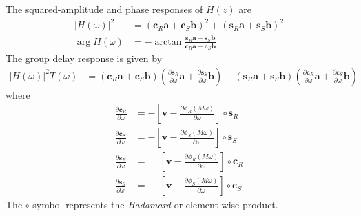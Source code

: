 \documentclass[a4paper,twoside,10pt,english]{report}
\begin{document}
The squared-amplitude and phase responses of $H\left(z\right)$ are
\begin{align*}
\left|H\left(\omega\right)\right|^{2}&=
\left(\boldsymbol{c}_{R}\boldsymbol{a}+
\boldsymbol{c}_{S}\boldsymbol{b}\right)^{2}+
\left(\boldsymbol{s}_{R}\boldsymbol{a}+
\boldsymbol{s}_{S}\boldsymbol{b}\right)^{2}\\
\arg H\left(\omega\right)&=-\arctan 
\frac{\boldsymbol{s}_{R}\boldsymbol{a}+\boldsymbol{s}_{S}\boldsymbol{b}}
     {\boldsymbol{c}_{R}\boldsymbol{a}+\boldsymbol{c}_{S}\boldsymbol{b}}
\end{align*}
The group delay response is given by
\begin{align*}
\left|H\left(\omega\right)\right|^{2}T\left(\omega\right)&=
\left(\boldsymbol{c}_{R}\boldsymbol{a}+
      \boldsymbol{c}_{S}\boldsymbol{b}\right)
\left(\frac{\partial\boldsymbol{s}_{R}}{\partial\omega}\boldsymbol{a}+
      \frac{\partial\boldsymbol{s}_{S}}{\partial\omega}\boldsymbol{b}\right)-
\left(\boldsymbol{s}_{R}\boldsymbol{a}+
      \boldsymbol{s}_{S}\boldsymbol{b}\right)
\left(\frac{\partial\boldsymbol{c}_{R}}{\partial\omega}\boldsymbol{a}+
      \frac{\partial\boldsymbol{c}_{S}}{\partial\omega}\boldsymbol{b}\right)
\end{align*}
where
\begin{align*}
\frac{\partial\boldsymbol{c}_{R}}{\partial\omega}&=
-\left[\boldsymbol{v}-\frac{\partial\phi_{R}\left(M\omega\right)}{\partial\omega}
\right]\circ\boldsymbol{s}_{R}\\
\frac{\partial\boldsymbol{c}_{S}}{\partial\omega}&=
-\left[\boldsymbol{v}-\frac{\partial\phi_{S}\left(M\omega\right)}{\partial\omega}
\right]\circ\boldsymbol{s}_{S}\\
\frac{\partial\boldsymbol{s}_{R}}{\partial\omega}&=
\phantom{-}\left[\boldsymbol{v}-\frac{\partial\phi_{R}\left(M\omega\right)}
{\partial\omega}\right]\circ\boldsymbol{c}_{R}\\
\frac{\partial\boldsymbol{s}_{S}}{\partial\omega}&=
\phantom{-}\left[\boldsymbol{v}-\frac{\partial\phi_{S}\left(M\omega\right)}
{\partial\omega}\right]\circ\boldsymbol{c}_{S}
\end{align*}
The $\circ$ symbol represents the \emph{Hadamard} or element-wise product.
\end{document}
